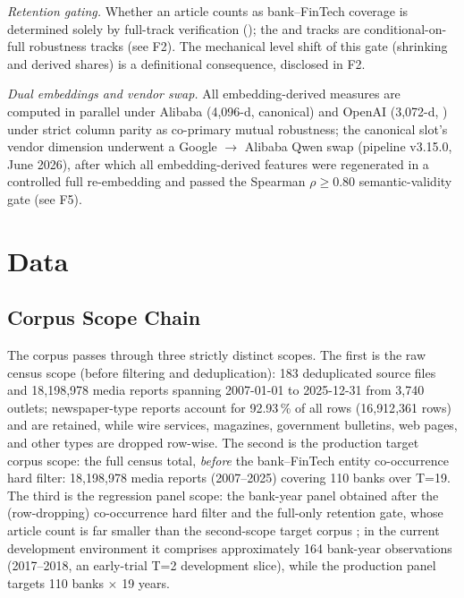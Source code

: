 \emph{Retention gating.} Whether an article counts as bank--FinTech
coverage is determined solely by full-track verification
(); the  and  tracks are
conditional-on-full robustness tracks (see F2). The mechanical level
shift of this gate (shrinking  and derived shares)
is a definitional consequence, disclosed in F2.

\emph{Dual embeddings and vendor swap.} All embedding-derived
measures are computed in parallel under Alibaba
 (4{,}096-d, canonical) and OpenAI
 (3{,}072-d, ) under strict
column parity as co-primary mutual robustness; the canonical slot's
vendor dimension underwent a Google $\to$ Alibaba Qwen swap (pipeline
v3.15.0, June 2026), after which all embedding-derived features were
regenerated in a controlled full re-embedding and passed the Spearman
$\rho\geq0.80$ semantic-validity gate (see F5).

\section{Data}\label{sec:data}

\subsection{Corpus Scope Chain}
The corpus passes through three strictly distinct scopes. The first
is the raw census scope (before filtering and deduplication): 183
deduplicated source files and 18{,}198{,}978 media reports spanning
2007-01-01 to 2025-12-31 from 3{,}740 outlets; newspaper-type reports
account for 92.93\,\% of all rows (16{,}912{,}361 rows) and are
retained, while wire services, magazines, government bulletins, web
pages, and other types are dropped row-wise. The second is the
production target corpus scope: the full census total,
\emph{before} the bank--FinTech entity co-occurrence hard filter:
18{,}198{,}978 media reports (2007--2025) covering 110 banks over
T=19. The third is the regression panel scope: the bank-year panel
obtained after the (row-dropping) co-occurrence hard filter and the
full-only retention gate, whose article count is far smaller than the
second-scope target corpus ; in the current development environment it
comprises approximately 164 bank-year observations (2017--2018, an early-trial T=2
development slice), while the production panel targets 110 banks
$\times$ 19 years. 

